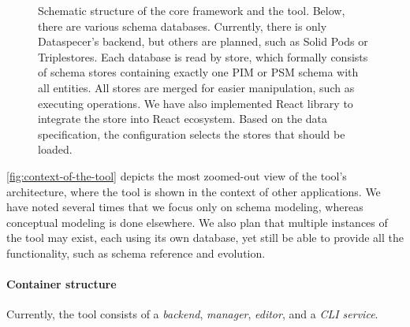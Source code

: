 {\begin{figure}
    \caption{Schematic structure of the core framework and the tool. Below, there are various schema databases. Currently, there is only Dataspecer's backend, but others are planned, such as Solid Pods or Triplestores. Each database is read by store, which formally consists of schema stores containing exactly one PIM or PSM schema with all entities. All stores are merged for easier manipulation, such as executing operations. We have also implemented React library to integrate the store into React ecosystem. Based on the data specification, the configuration selects the stores that should be loaded.} \label{fig:schematic}
\end{figure}
\clearpage
}

\bigskip

\autoref{fig:context-of-the-tool} depicts the most zoomed-out view of the tool’s architecture, where the tool is shown in the context of other applications. We have noted several times that we focus only on schema modeling, whereas conceptual modeling is done elsewhere. We also plan that multiple instances of the tool may exist, each using its own database, yet still be able to provide all the functionality, such as schema reference and evolution.

\paragraph{Container structure} Currently, the tool consists of a \textit{backend}, \textit{manager}, \textit{editor}, and a \textit{CLI service}.

